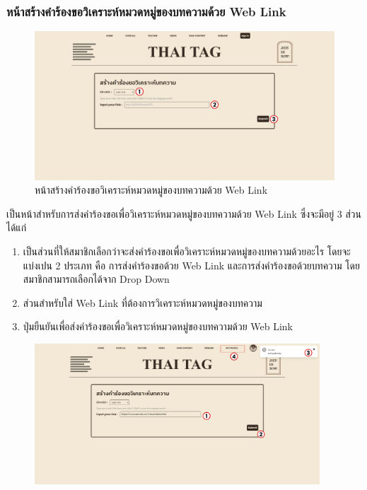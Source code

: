 \documentclass[12pt,oneside,openright,a4paper]{cpe-thai-project}
\begin{document}
\begin{itemize}
        \subsubsection{หน้าสร้างคำร้องขอวิเคราะห์หมวดหมู่ของบทความด้วย Web Link}
          \begin{figure}[!ht]\centering
            \includegraphics[width=\textwidth]{./img/project_ui/4_5.png}
            \caption{หน้าสร้างคำร้องขอวิเคราะห์หมวดหมู่ของบทความด้วย Web Link}\label{fig:exp_weblink}
          \end{figure}
          \newpage
          \hspace{1cm}เป็นหน้าสําหรับการส่งคําร้องขอเพื่อวิเคราะห์หมวดหมู่ของบทความด้วย Web Link ซึ่งจะมีอยู่ 3 ส่วน ได้แก่
          \begin{enumerate}
            \item เป็นส่วนที่ให้สมาชิกเลือกว่าจะส่งคําร้องขอเพื่อวิเคราะห์หมวดหมู่ของบทความด้วยอะไร โดยจะแบ่งเปน 2 ประเภท คือ 
            การส่งคําร้องขอด้วย Web Link และการส่งคําร้องขอด้วยบทความ โดยสมาชิกสามารถเลือกได้จาก Drop Down
            \item ส่วนสําหรับใส่ Web Link ที่ต้องการวิเคราะห์หมวดหมู่ของบทความ
            \item ปุ่มยืนยันเพื่อส่งคําร้องขอเพื่อวิเคราะห์หมวดหมู่ของบทความด้วย Web Link
          \end{enumerate}
          \begin{figure}[!ht]\centering
            \includegraphics[width=0.95\textwidth]{./img/project_ui/4_6.png}

\end{figure}
\end{itemize}
\end{document}
